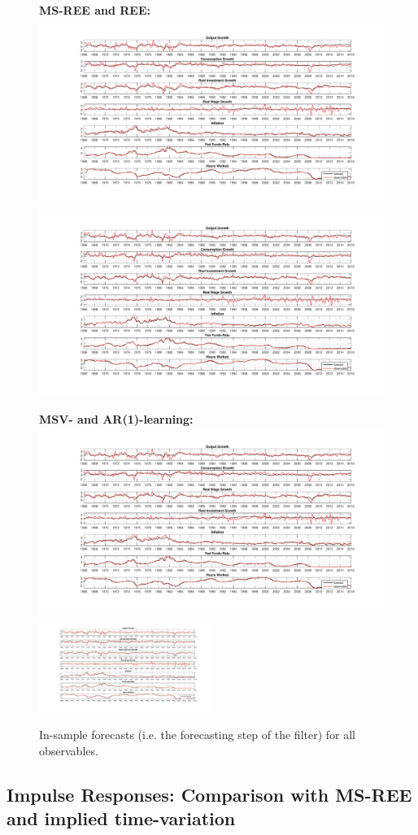 \documentclass[12pt,reqno]{article}
\numberwithin{equation}{section}
\begin{document}
\begin{figure}[H]

\caption{In-sample forecasts (i.e. the forecasting step of the filter) for all observables.}
\vspace{5 mm}

\textbf{MS-REE and REE: }\\
\includegraphics[height=.5\textheight,width=.5\textwidth]{rise_forecast_errors.pdf}
\includegraphics[height=.5\textheight,width=.5\textwidth]{REE_forecast_errors.pdf}


\textbf{MSV- and AR(1)-learning: }\\
\includegraphics[height=.5\textheight,width=.5\textwidth]{sw_msv_forecast_errors.pdf}
\includegraphics[height=0.5\textheight,width=0.5\textwidth]{sw_ar1_forecast_errors.pdf}



\end{figure}


\subsection{Impulse Responses: Comparison with MS-REE and implied time-variation}
\end{document}
